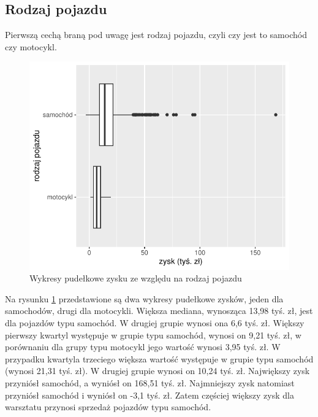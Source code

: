 \documentclass{article}\usepackage[]{graphicx}\usepackage[]{xcolor}
\makeatletter
\def\maxwidth{ %
  \ifdim\Gin@nat@width>\linewidth
    \linewidth
  \else
    \Gin@nat@width
  \fi
}
\newenvironment{knitrout}{}{} %
\makeatother
\begin{document}
\subsection{Rodzaj pojazdu}

Pierwszą cechą braną pod uwagę jest rodzaj pojazdu, czyli czy jest to samochód czy motocykl.

\begin{knitrout}
\color{fgcolor}\begin{figure}[H]

{\centering \includegraphics[width=\maxwidth]{figure/fig_typ-1} 

}

\caption[Wykresy pudełkowe zysku ze względu na rodzaj pojazdu]{Wykresy pudełkowe zysku ze względu na rodzaj pojazdu}\label{fig:fig_typ}
\end{figure}

\end{knitrout}

Na rysunku \ref{fig:fig_typ} przedstawione są dwa wykresy pudełkowe zysków, jeden dla samochodów, drugi dla motocykli. Większa mediana, wynosząca 13,98 tyś. zł, jest dla pojazdów typu samochód. W drugiej grupie wynosi ona 6,6 tyś. zł. 
Większy pierwszy kwartyl występuje w grupie typu samochód, wynosi on 9,21 tyś. zł, w porównaniu dla grupy typu motocykl jego wartość wynosi 3,95 tyś. zł.
W przypadku kwartyla trzeciego większa wartość występuje w grupie typu samochód (wynosi 21,31 tyś. zł). W drugiej grupie wynosi on 10,24 tyś. zł.
Największy zysk przyniósł samochód, a wyniósł on 168,51 tyś. zł. 
Najmniejszy zysk natomiast przyniósł samochód i wyniósł on -3,1 tyś. zł. Zatem częściej większy zysk dla warsztatu przynosi sprzedaż pojazdów typu samochód. 
\end{document}
